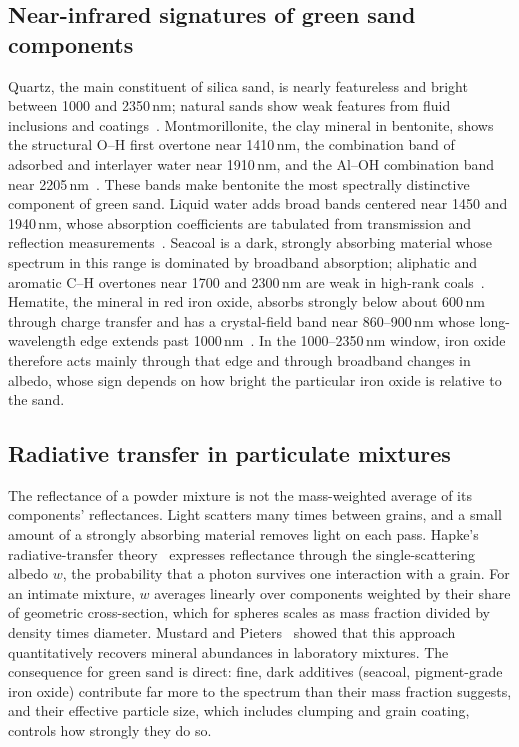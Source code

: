 \documentclass[10pt,twocolumn,letterpaper]{article}
\begin{document}
\subsection{Near-infrared signatures of green sand components}

Quartz, the main constituent of silica sand, is nearly featureless and bright between 1000 and 2350\,nm; natural sands show weak features from fluid inclusions and coatings~\cite{clark1990}. Montmorillonite, the clay mineral in bentonite, shows the structural O--H first overtone near 1410\,nm, the combination band of adsorbed and interlayer water near 1910\,nm, and the Al--OH combination band near 2205\,nm~\cite{clark1990,bishop1994}. These bands make bentonite the most spectrally distinctive component of green sand. Liquid water adds broad bands centered near 1450 and 1940\,nm, whose absorption coefficients are tabulated from transmission and reflection measurements~\cite{hale1973,segelstein1981}. Seacoal is a dark, strongly absorbing material whose spectrum in this range is dominated by broadband absorption; aliphatic and aromatic C--H overtones near 1700 and 2300\,nm are weak in high-rank coals~\cite{workman2012}. Hematite, the mineral in red iron oxide, absorbs strongly below about 600\,nm through charge transfer and has a crystal-field band near 860--900\,nm whose long-wavelength edge extends past 1000\,nm~\cite{sherman1985}. In the 1000--2350\,nm window, iron oxide therefore acts mainly through that edge and through broadband changes in albedo, whose sign depends on how bright the particular iron oxide is relative to the sand.

\subsection{Radiative transfer in particulate mixtures}

The reflectance of a powder mixture is not the mass-weighted average of its components' reflectances. Light scatters many times between grains, and a small amount of a strongly absorbing material removes light on each pass. Hapke's radiative-transfer theory~\cite{hapke1981,hapke2012} expresses reflectance through the single-scattering albedo $w$, the probability that a photon survives one interaction with a grain. For an intimate mixture, $w$ averages linearly over components weighted by their share of geometric cross-section, which for spheres scales as mass fraction divided by density times diameter. Mustard and Pieters~\cite{mustard1989} showed that this approach quantitatively recovers mineral abundances in laboratory mixtures. The consequence for green sand is direct: fine, dark additives (seacoal, pigment-grade iron oxide) contribute far more to the spectrum than their mass fraction suggests, and their effective particle size, which includes clumping and grain coating, controls how strongly they do so.
\end{document}
